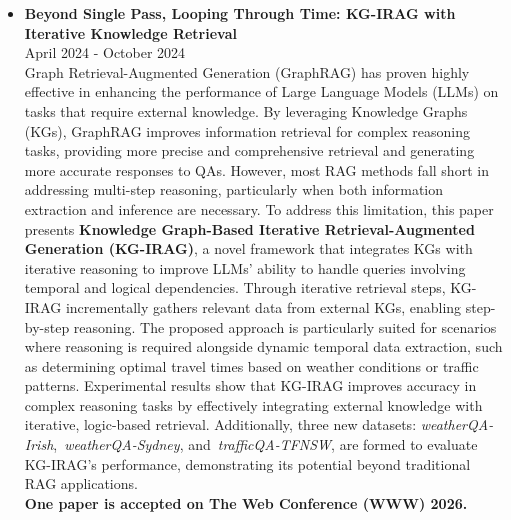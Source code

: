 \documentclass[10pt,article]{article}
\begin{document}
\begin{itemize}
    \item \textbf{Beyond Single Pass, Looping Through Time: KG-IRAG with Iterative Knowledge Retrieval} \\ \hfill April 2024 - October 2024 \\
    Graph Retrieval-Augmented Generation (GraphRAG) has proven highly effective in enhancing the performance of Large Language Models (LLMs) on tasks that require external knowledge. By leveraging Knowledge Graphs (KGs), GraphRAG improves information retrieval for complex reasoning tasks, providing more precise and comprehensive retrieval and generating more accurate responses to QAs. However, most RAG methods fall short in addressing multi-step reasoning, particularly when both information extraction and inference are necessary. To address this limitation, this paper presents \textbf{Knowledge Graph-Based Iterative Retrieval-Augmented Generation (KG-IRAG)}, a novel framework that integrates KGs with iterative reasoning to improve LLMs' ability to handle queries involving temporal and logical dependencies. Through iterative retrieval steps, KG-IRAG incrementally gathers relevant data from external KGs, enabling step-by-step reasoning. The proposed approach is particularly suited for scenarios where reasoning is required alongside dynamic temporal data extraction, such as determining optimal travel times based on weather conditions or traffic patterns. Experimental results show that KG-IRAG improves accuracy in complex reasoning tasks by effectively integrating external knowledge with iterative, logic-based retrieval. Additionally, three new datasets: \textit{weatherQA-Irish},~\textit{weatherQA-Sydney}, and~\textit{trafficQA-TFNSW}, are formed to evaluate KG-IRAG’s performance, demonstrating its potential beyond traditional RAG applications.\\
    \textbf{One paper is accepted on The Web Conference (WWW) 2026.}


\end{itemize}
\end{document}
